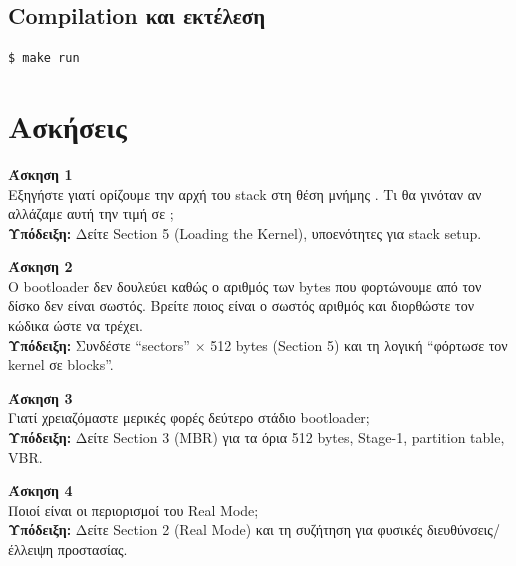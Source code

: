 \documentclass[18pt]{extarticle}
\begin{document}
\subsection{Compilation και εκτέλεση}

\begin{commandline}
\begin{verbatim}
$ make run
\end{verbatim}
\end{commandline}


\section{Ασκήσεις}

\begin{question}
\textbf{Άσκηση 1}\\
Εξηγήστε γιατί ορίζουμε την αρχή του stack στη θέση μνήμης . Τι θα γινόταν αν αλλάζαμε αυτή την τιμή σε ;\\
\textbf{Υπόδειξη:} Δείτε Section 5 (Loading the Kernel), υποενότητες για stack setup.
\end{question}

\begin{question}
\textbf{Άσκηση 2}\\
Ο bootloader δεν δουλεύει καθώς ο αριθμός των bytes που φορτώνουμε από τον δίσκο δεν είναι σωστός.
Βρείτε ποιος είναι ο σωστός αριθμός και διορθώστε τον κώδικα ώστε να τρέχει.\\
\textbf{Υπόδειξη:} Συνδέστε “sectors” $\times$ 512 bytes (Section 5) και τη λογική “φόρτωσε τον kernel σε blocks”.
\end{question}

\begin{question}
\textbf{Άσκηση 3}\\
Γιατί χρειαζόμαστε μερικές φορές δεύτερο στάδιο bootloader;\\
\textbf{Υπόδειξη:} Δείτε Section 3 (MBR) για τα όρια 512 bytes, Stage-1, partition table, VBR.
\end{question}

\begin{question}
\textbf{Άσκηση 4}\\
Ποιοί είναι οι περιορισμοί του Real Mode;\\
\textbf{Υπόδειξη:} Δείτε Section 2 (Real Mode) και τη συζήτηση για φυσικές διευθύνσεις/έλλειψη προστασίας.
\end{question}
\end{document}
